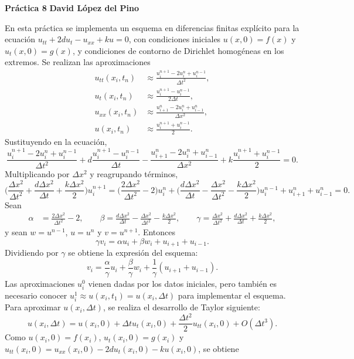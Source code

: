 \documentclass[a4paper, 11pt, oneside]{report}
\begin{document}
\noindent \textbf{Práctica 8} \hfill \textbf{David López del Pino}

\hfill

En esta práctica se implementa un esquema en diferencias finitas explícito para la ecuación $u_{tt}+2du_t-u_{xx}+ku = 0$, con condiciones iniciales $u(x,0) = f(x)$ y $u_t(x,0) = g(x)$, y condiciones de contorno de Dirichlet homogéneas en los extremos. Se realizan las aproximaciones
\begin{align*}
    u_{tt}(x_i,t_n) &\approx \frac{u_i^{n+1}-2u_i^n + u_i^{n-1}}{\Delta t^2}, \\[5pt]
    u_{t}(x_i,t_n) &\approx \frac{u_i^{n+1}-u_i^{n-1}}{2\Delta t}, \\[5pt]
    u_{xx}(x_i,t_n) &\approx \frac{u_{i+1}^n -2u_i^n + u_{i-1}^n}{\Delta x^2}, \\[5pt]
    u(x_i,t_n) &\approx \frac{u_{i}^{n+1}+u_{i}^{n-1}}{2}.
\end{align*}
Sustituyendo en la ecuación,
\[\frac{u_i^{n+1}-2u_i^n + u_i^{n-1}}{\Delta t^2}+d\frac{u_i^{n+1}-u_i^{n-1}}{\Delta t}-\frac{u_{i+1}^n -2u_i^n + u_{i-1}^n}{\Delta x^2}+k\frac{u_{i}^{n+1}+u_{i}^{n-1}}{2} = 0.\]
Multiplicando por $\Delta x^2$ y reagrupando términos,
\[\bigl(\frac{\Delta x^2}{\Delta t^2}+\frac{d\Delta x^2}{\Delta t}+\frac{k\Delta x^2}{2}\bigr)u_i^{n+1} = \bigl(\frac{2\Delta x^2}{\Delta t^2}-2\bigr)u_i^n+\bigl(\frac{d\Delta x^2}{\Delta t}-\frac{\Delta x^2}{\Delta t^2} - \frac{k\Delta x^2}{2}\bigr)u_i^{n-1}+u_{i+1}^n+u_{i-1}^n = 0.\]
Sean
\begin{align*}
    \alpha &= \frac{2\Delta x^2}{\Delta t^2} - 2, \qquad \beta = \frac{d\Delta x^2}{\Delta t} - \frac{\Delta x^2}{\Delta t^2} - \frac{k\Delta x^2}{2}, \qquad \gamma = \frac{\Delta x^2}{\Delta t^2} + \frac{d\Delta x^2}{\Delta t} + \frac{k\Delta x^2}{2},
\end{align*}
y sean $w = u^{n-1}$, $u = u^n$ y $v = u^{n+1}$.
Entonces
\[\gamma v_i = \alpha u_i + \beta w_i + u_{i+1}+u_{i-1}.\]
Dividiendo por $\gamma$ se obtiene la expresión del esquema:
\[v_i = \frac{\alpha}{\gamma} u_i + \frac{\beta}{\gamma}w_i + \frac{1}{\gamma}(u_{i+1}+u_{i-1}).\]
Las aproximaciones $u_i^0$ vienen dadas por los datos iniciales, pero también es necesario conocer $u_i^1 \approx u(x_i,t_1) = u(x_i,\Delta t)$ para implementar el esquema. Para aproximar $u(x_i, \Delta t)$, se realiza el desarrollo de Taylor siguiente:
\[u(x_i,\Delta t) = u(x_i,0)+\Delta t u_t(x_i, 0) + \frac{\Delta t^2}{2}u_{tt}(x_i,0)+O(\Delta t^3).\]
Como $u(x_i,0) = f(x_i)$, $u_t(x_i,0) = g(x_i)$ y $u_{tt}(x_i,0) = u_{xx}(x_i,0)-2du_t(x_i,0)-ku(x_i,0)$, se obtiene
\end{document}
